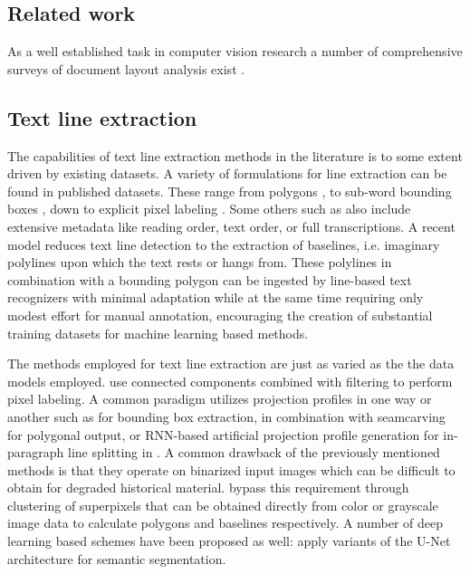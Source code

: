 \subsection{Related work}

As a well established task in computer vision research a number of
comprehensive surveys of document layout analysis exist
\cite{binmakhashen2019document, eskenazi:hal-01388088, nagy2000twenty}. 

\subsection{Text line extraction}

The capabilities of text line extraction methods in the literature is to some
extent driven by existing datasets. A variety of formulations for line
extraction can be found in published datasets. These range from polygons
\cite{fischer2011transcription,simistira2016diva,clausner2018icfhr}, to
sub-word bounding boxes \cite{kassis2017vml}, down to explicit pixel labeling
\cite{gatos2010icfhr}. Some others such as
\cite{antonacopoulos2015icdar2015,antonacopoulos2011historical} also include
extensive metadata like reading order, text order, or full transcriptions. A
recent model \cite{diem2017cbad} reduces text line detection to the extraction
of baselines, i.e. imaginary polylines upon which the text rests or hangs from.
These polylines in combination with a bounding polygon can be ingested by
line-based text recognizers with minimal adaptation while at the same time
requiring only modest effort for manual annotation, encouraging the creation of
substantial training datasets for machine learning based methods.

The methods employed for text line extraction are just as varied as the the
data models employed. \cite{ouwayed2012general, borse2014language} use
connected components combined with filtering to perform pixel labeling. A
common paradigm utilizes projection profiles in one way or another such as
\cite{diem2013text} for bounding box extraction, \cite{arvanitopoulos2014seam,
saabni2014text} in combination with seamcarving for polygonal output, or
RNN-based artificial projection profile generation for in-paragraph line
splitting in \cite{moysset2015paragraph}. A common drawback of the previously
mentioned methods is that they operate on binarized input images which can be
difficult to obtain for degraded historical material.
\cite{garz2012binarization, ahn2017textline, gruuening2017robust}
bypass this requirement through clustering of superpixels that can be obtained
directly from color or grayscale image data to calculate polygons and baselines
respectively. A number of deep learning based schemes have been proposed as
well: \cite{mechi2019text, quiros2018multi, oliveira2018dhsegment}
apply variants of the U-Net architecture for semantic segmentation.

